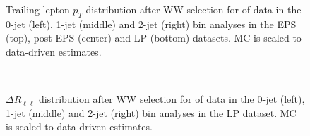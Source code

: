 \begin{figure}[!hbtp]
\caption{
Trailing lepton $p_T$ distribution after WW selection for \lpintlumi of data in the 0-jet (left), 
1-jet (middle) and 2-jet (right) bin analyses in the EPS (top), post-EPS (center) and LP (bottom) datasets.
MC is scaled to data-driven estimates.
}
\label{fig:ww_ptmin_lp}
\end{figure}

\clearpage

\begin{figure}[!hbtp]
\centering
{}
\\
\caption{
$\Delta R_{\ell\ell}$ distribution after WW selection for \lpintlumi of data in the 0-jet (left),
1-jet (middle) and 2-jet (right) bin analyses in the LP dataset.
MC is scaled to data-driven estimates.
}
\label{fig:ww_deltaphi_lp}
\end{figure}

\clearpage


